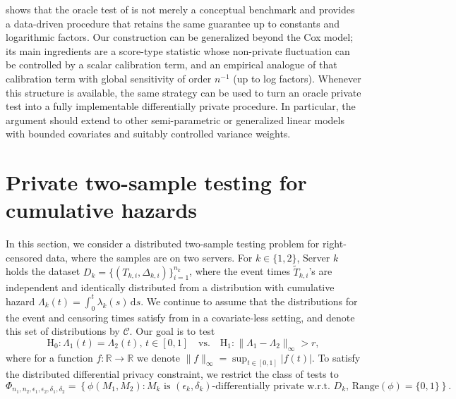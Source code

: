 \documentclass[11pt]{article}
\newcommand{\dint}{\,\mathrm{d}}
\begin{document}
 shows that the oracle test of  is not merely a conceptual benchmark and provides a data-driven procedure that retains the same guarantee up to constants and logarithmic factors. Our construction can be generalized beyond the Cox model; its main ingredients are a score-type statistic whose non-private fluctuation can be controlled by a scalar calibration term, and an empirical analogue of that calibration term with global sensitivity of order $n^{-1}$ (up to log factors). Whenever this structure is available, the same strategy can be used to turn an oracle private test into a fully implementable differentially private procedure. In particular, the argument should extend to other semi-parametric or generalized linear models with bounded covariates and suitably controlled variance weights. 



\section{Private two-sample testing for cumulative hazards}\label{sec-4}
In this section, we consider a distributed two-sample testing problem for right-censored data, where the samples are on two servers. For $k \in \{1, 2\}$,  Server $k$ holds the dataset $D_k = \{(T_{k,i}, \Delta_{k,i})\}_{i=1}^{n_k}$, where the event times $\tilde{T}_{k, i}$'s are independent and identically distributed from a distribution with cumulative hazard $\Lambda_k(t) = \int_0^t \lambda_k(s) \dint s$. We continue to assume that the distributions for the event and censoring times satisfy  from  in a covariate-less setting, and denote this set of distributions by $\mathcal{C}$.  Our goal is to test 
\begin{equation} \label{eq-two-sample-test}
    \mathrm{H}_0: \Lambda_1(t) = \Lambda_2(t), \, t \in [0, 1] \quad \mbox{vs.} \quad \mathrm{H}_1: \|\Lambda_1 - \Lambda_2\|_{\infty} > r,
\end{equation}
where for a function $f:\mathbb{R} \rightarrow \mathbb{R}$ we denote $\|f\|_{\infty} = \sup_{t \in [0, 1]} |f(t)|$. To satisfy the distributed differential privacy constraint, we restrict the class of tests to
\begin{equation*}
    \Phi_{n_1, n_2, \epsilon_1, \epsilon_2, \delta_1, \delta_2} = \left\{\phi(M_1, M_2): M_k \text{ is $(\epsilon_k, \delta_k)$-differentially private w.r.t.~} D_k, \,\mathrm{Range}(\phi)=\{0, 1\} \right\}.
\end{equation*}
\end{document}
